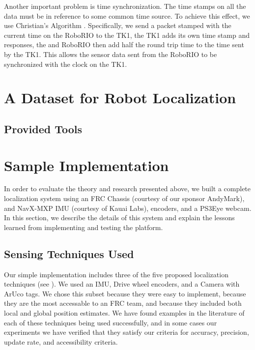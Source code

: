 \documentclass{article}
\newcommand{\Newnameref}[1]{\textit{\nameref{#1}}}
\begin{document}
		Another important problem is time synchronization. The time stamps on all the data must be in reference to some common time source. To achieve this effect, we use Christian's Algorithm \cite{cristian_probabilistic_1989}. Specifically, we send a packet stamped with the current time on the RoboRIO to the TK1, the TK1 adds its own time stamp and responses, the and RoboRIO then add half the round trip time to the time sent by the TK1. This allows the sensor data sent from the RoboRIO to be synchronized with the clock on the TK1.




\section{A Dataset for Robot Localization} \label{section:dataset}

  \subsection{Provided Tools} \label{section:tools}




\section{Sample Implementation} \label{section:specs}

  In order to evaluate the theory and research presented above, we built a complete localization system using an FRC Chassis (courtesy of our sponsor AndyMark), and NavX-MXP IMU (courtesy of Kauai Labs), encoders, and a PS3Eye webcam. In this section, we describe the details of this system and explain the lessons learned from implementing and testing the platform.

  \subsection{Sensing Techniques Used}\label{section:techniques_used}

    Our simple implementation includes three of the five proposed localization techniques (see \Newnameref{section:proposed_techniques}). We used an IMU, Drive wheel encoders, and a Camera with ArUco tags. We chose this subset because they were easy to implement, because they are the most accessable to an FRC team, and because they included both local and global position estimates. We have found examples in the literature of each of these techniques being used successfully, and in some cases our experiments we have verified that they satisfy our criteria for accuracy, precision, update rate, and accessibility criteria.
\end{document}
